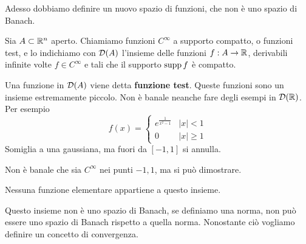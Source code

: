 Adesso dobbiamo definire un nuovo spazio di funzioni, che non è uno spazio di Banach.
\begin{defn}
Sia $A\subset \mathbb{R}^{n}$ aperto. Chiamiamo funzioni $C^{\infty}$ a supporto compatto, o funzioni test, e lo indichiamo con $\mathcal{D}(A)$ l'insieme delle funzioni $f: A\rightarrow \mathbb{R}$, derivabili infinite volte $f\in C^{\infty}$ e tali che il supporto $\operatorname*{supp} f$ è compatto.
\end{defn}
Una funzione in $\mathcal{D}(A)$ viene detta \textbf{funzione test}. Queste funzioni sono un insieme estremamente piccolo. Non è banale neanche fare degli esempi in $\mathcal{D}(\mathbb{R})$. Per esempio
\begin{equation*}
f(x) =
\begin{cases}
e^{\frac{1}{x^{2} - 1}} & | x| < 1\\
0 & | x| \geq 1
\end{cases}
\end{equation*}
Somiglia a una gaussiana, ma fuori da $[ - 1, 1]$ si annulla.


Non è banale che sia $C^{\infty}$ nei punti $ - 1, 1$, ma si può dimostrare.

Nessuna funzione elementare appartiene a questo insieme.

Questo insieme non è uno spazio di Banach, se definiamo una norma, non può essere uno spazio di Banach rispetto a quella norma. Nonostante ciò vogliamo definire un concetto di convergenza.

